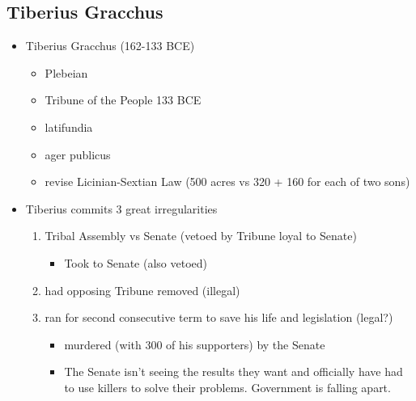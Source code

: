 \documentclass[12pt, twoside]{article}
\begin{document}
\subsection{Tiberius Gracchus}
\begin{itemize}
\item Tiberius Gracchus (162-133 BCE)
	\begin{itemize}
	\item Plebeian
	\item Tribune of the People 133 BCE
	\item latifundia 
	\item ager publicus
	\item revise Licinian-Sextian Law (500 acres vs 320 + 160 for each of two sons)
	\end{itemize}
\item Tiberius commits 3 great irregularities
	\begin{enumerate}
	\item Tribal Assembly vs Senate (vetoed by Tribune loyal to Senate)
		\begin{itemize}
	 	\item Took to Senate (also vetoed)
	 	\end{itemize}
	\item had opposing Tribune removed (illegal)
	\item ran for second consecutive term to save his life and legislation (legal?)
		\begin{itemize}
		\item murdered (with 300 of his supporters) by the Senate
		\item The Senate isn't seeing the results they want and officially have had to use killers to solve their problems.  Government is falling apart.
		\end{itemize}
	\end{enumerate}
\end{itemize}
\end{document}
